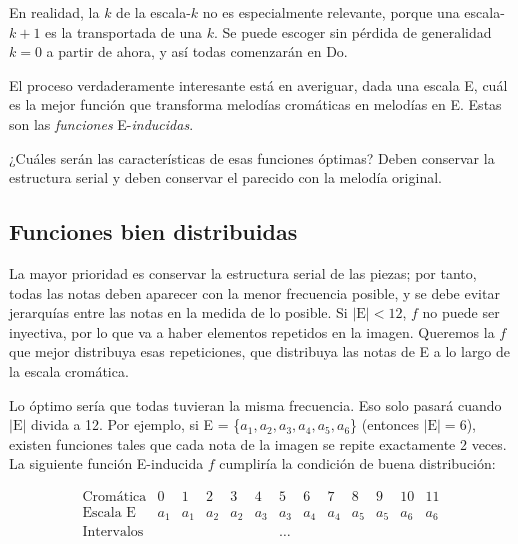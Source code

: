 		
		En realidad, la $k$ de la escala-$k$ no es especialmente relevante, porque una escala-$k+1$ es la transportada de una $k$. Se puede escoger sin pérdida de generalidad $k=0$ a partir de ahora, y así todas comenzarán en Do.
		
		El proceso verdaderamente interesante está en averiguar, dada una escala E, cuál es la mejor función que transforma melodías cromáticas en melodías en E. Estas son las \textit{funciones} E-\textit{inducidas}.
		
		¿Cuáles serán las características de esas funciones óptimas? Deben conservar la estructura serial y deben conservar el parecido con la melodía original.
		
	\subsection{Funciones bien distribuidas}
		
		La mayor prioridad es conservar la estructura serial de las piezas; por tanto, todas las notas deben aparecer con la menor frecuencia posible, y se debe evitar jerarquías entre las notas en la medida de lo posible. Si $|\text{E}|<12$, $f$ no puede ser inyectiva, por lo que va a haber elementos repetidos en la imagen. Queremos la $f$ que mejor distribuya esas repeticiones, que distribuya las notas de E a lo largo de la escala cromática.
		
		Lo óptimo sería que todas tuvieran la misma frecuencia. Eso solo pasará cuando $|\text{E}|$ divida a 12. Por ejemplo, si E = \{$a_1,a_2,a_3,a_4,a_5,a_6$\} (entonces $|\text{E}|=6$), existen funciones tales que cada nota de la imagen se repite exactamente 2 veces. La siguiente función E-inducida $f$ cumpliría la condición de buena distribución:
				
		\[\left.\begin{matrix}
		\text{Cromática}&0&1&2&3&4&5&6&7&8&9&10&11\\
		\text{Escala E}&a_1&a_1&a_2&a_2&a_3&a_3&a_4&a_4&a_5&a_5&a_6&a_6\\
		\text{Intervalos}&&&&&&\ldots\\
		\end{matrix}\right.\]
		
